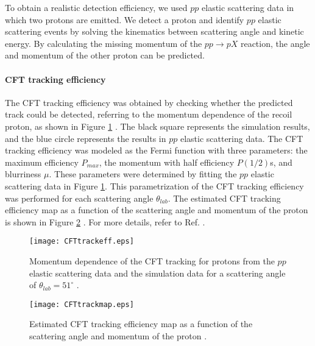 To obtain a realistic detection efficiency, we used $pp$ elastic scattering data in which two protons are emitted. We detect a proton and identify $pp$ elastic scattering events by solving the kinematics between scattering angle and kinetic energy. By calculating the missing momentum of the $pp\rightarrow pX$ reaction, the angle and momentum of the other proton can be predicted.

\vspace{10pt}
\paragraph{CFT tracking efficiency}
The CFT tracking efficiency was obtained by checking whether the predicted track could be detected, referring to the momentum dependence of the recoil proton, as shown in Figure \ref{fig-CFTtrackeff} \cite{Miwa-SMp}. The black square represents the simulation results, and the blue circle represents the results in $pp$ elastic scattering data. The CFT tracking efficiency was modeled as the Fermi function with three parameters: the maximum efficiency $P_{max}$, the momentum with half efficiency $P(1/2)$s, and blurriness $\mu$. These parameters were determined by fitting the $pp$ elastic scattering data in Figure \ref{fig-CFTtrackeff}. This parametrization of the CFT tracking efficiency was performed for each scattering angle $\theta_{lab}$. The estimated CFT tracking efficiency map as a function of the scattering angle and momentum of the proton is shown in Figure \ref{fig-CFTtrackmap} \cite{Miwa-SMp}. For more details, refer to Ref. \cite{Miwa-SMp}.

\begin{figure}[!h]
  \begin{center}
    \texttt{[image: CFTtrackeff.eps]}
    \caption{Momentum dependence of the CFT tracking for protons from the $pp$ elastic scattering data and the simulation data for a scattering angle of $\theta_{lab}=51^{\circ}$ \cite{Miwa-SMp}.}
    \label{fig-CFTtrackeff}
  \end{center}
\end{figure}

\begin{figure}[!h]
  \begin{center}
    \texttt{[image: CFTtrackmap.eps]}
    \caption{Estimated CFT tracking efficiency map as a function of the scattering angle and momentum of the proton \cite{Miwa-SMp}.}
    \label{fig-CFTtrackmap}
  \end{center}
\end{figure}


